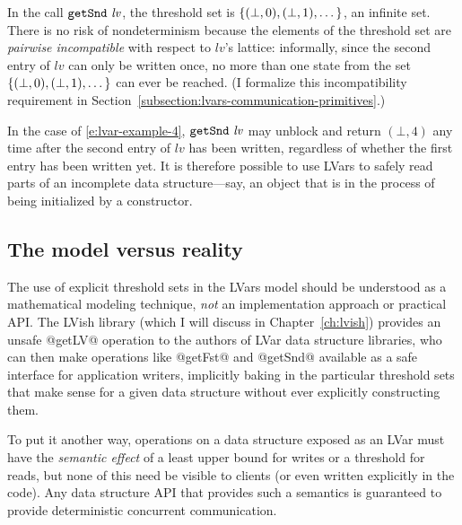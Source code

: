 In the call $\mbox{\texttt{getSnd}}~\mathit{lv}$, the threshold set is
$\left\{(\bot, 0), (\bot, 1), \dots\right\}$, an infinite set.  There is no
risk of nondeterminism because the elements of the threshold set are
\emph{pairwise incompatible} with respect to $\mathit{lv}$'s lattice:
informally, since the second entry of $\mathit{lv}$ can only be
written once, no more than one state from the set $\left\{(\bot, 0),
  (\bot, 1), \dots\right\}$ can ever be reached.  (I formalize this
incompatibility requirement in
Section~\ref{subsection:lvars-communication-primitives}.)

In the case of \ref{e:lvar-example-4}, $\mbox{\texttt{getSnd}}~\mathit{lv}$ may
unblock and return $(\bot, 4)$ any time after the second entry of
$\mathit{lv}$ has been written, regardless of whether the first entry
has been written yet.  It is therefore possible to use LVars to safely
read parts of an incomplete data structure---say, an object that is in
the process of being initialized by a constructor.

\subsection{The model versus reality}\label{subsection:lvars-the-model-versus-reality}

The use of explicit threshold sets in the LVars model should be
understood as a mathematical modeling technique, \emph{not} an
implementation approach or practical API.  The LVish library (which I
will discuss in Chapter~\ref{ch:lvish}) provides an unsafe @getLV@
operation to the authors of LVar data structure libraries, who can
then make operations like @getFst@ and @getSnd@ available as a safe
interface for application writers, implicitly baking in the particular
threshold sets that make sense for a given data structure without ever
explicitly constructing them.

To put it another way, operations on a data structure exposed as an
LVar must have the \emph{semantic effect} of a least upper bound for
writes or a threshold for reads, but none of this need be visible to
clients (or even written explicitly in the code).  Any data structure
API that provides such a semantics is guaranteed to provide
deterministic concurrent communication.
